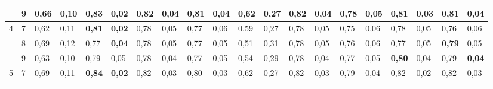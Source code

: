 \documentclass[conference]{IEEEtran}
\begin{document}
\begin{table}[]
\begin{tabular}{|cl|ll|ll|ll|ll|ll|ll|ll|ll|ll|}
		\multicolumn{1}{|c|}{}                    & 9 & \multicolumn{1}{l|}{0,66}          & 0,10          & \multicolumn{1}{l|}{\textbf{0,83}} & \textbf{0,02} & \multicolumn{1}{l|}{0,82}          & 0,04          & \multicolumn{1}{l|}{0,81} & 0,04          & \multicolumn{1}{l|}{0,62}                 & 0,27          & \multicolumn{1}{l|}{0,82}          & 0,04          & \multicolumn{1}{l|}{0,78}          & 0,05          & \multicolumn{1}{l|}{0,81}          & 0,03          & \multicolumn{1}{l|}{0,81}          & 0,04          \\ \hline
		\multicolumn{1}{|c|}{\multirow{3}{*}{4}}  & 7 & \multicolumn{1}{l|}{0,62}          & 0,11          & \multicolumn{1}{l|}{\textbf{0,81}} & \textbf{0,02} & \multicolumn{1}{l|}{0,78}          & 0,05          & \multicolumn{1}{l|}{0,77} & 0,06          & \multicolumn{1}{l|}{0,59}                 & 0,27          & \multicolumn{1}{l|}{0,78}          & 0,05          & \multicolumn{1}{l|}{0,75}          & 0,06          & \multicolumn{1}{l|}{0,78}          & 0,05          & \multicolumn{1}{l|}{0,76}          & 0,06          \\ \cline{2-20} 
		\multicolumn{1}{|c|}{}                    & 8 & \multicolumn{1}{l|}{0,69}          & 0,12          & \multicolumn{1}{l|}{0,77}          & \textbf{0,04} & \multicolumn{1}{l|}{0,78}          & 0,05          & \multicolumn{1}{l|}{0,77} & 0,05          & \multicolumn{1}{l|}{0,51}                 & 0,31          & \multicolumn{1}{l|}{0,78}          & 0,05          & \multicolumn{1}{l|}{0,76}          & 0,06          & \multicolumn{1}{l|}{0,77}          & 0,05          & \multicolumn{1}{l|}{\textbf{0,79}} & 0,05          \\ \cline{2-20} 
		\multicolumn{1}{|c|}{}                    & 9 & \multicolumn{1}{l|}{0,63}          & 0,10          & \multicolumn{1}{l|}{0,79}          & 0,05          & \multicolumn{1}{l|}{0,78}          & 0,04          & \multicolumn{1}{l|}{0,77} & 0,05          & \multicolumn{1}{l|}{0,54}                 & 0,29          & \multicolumn{1}{l|}{0,78}          & 0,04          & \multicolumn{1}{l|}{0,77}          & 0,05          & \multicolumn{1}{l|}{\textbf{0,80}} & 0,04          & \multicolumn{1}{l|}{0,79}          & \textbf{0,04} \\ \hline
		\multicolumn{1}{|c|}{\multirow{3}{*}{5}}  & 7 & \multicolumn{1}{l|}{0,69}          & 0,11          & \multicolumn{1}{l|}{\textbf{0,84}} & \textbf{0,02} & \multicolumn{1}{l|}{0,82}          & 0,03          & \multicolumn{1}{l|}{0,80} & 0,03          & \multicolumn{1}{l|}{0,62}                 & 0,27          & \multicolumn{1}{l|}{0,82}          & 0,03          & \multicolumn{1}{l|}{0,79}          & 0,04          & \multicolumn{1}{l|}{0,82}          & 0,02          & \multicolumn{1}{l|}{0,82}          & 0,03          \\ \cline{2-20} 

\end{tabular}
\end{table}
\end{document}
